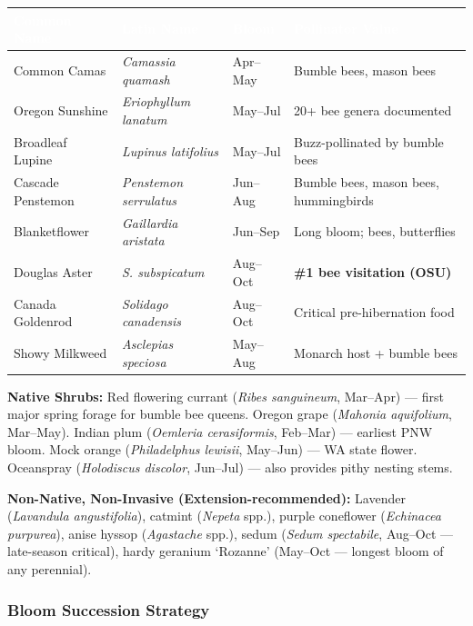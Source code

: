 \documentclass[11pt,letterpaper]{article}
\newcommand{\tableheader}[1]{\textbf{\sffamily\textcolor{white}{#1}}}
\begin{document}
\begin{center}
\begin{tabularx}{\textwidth}{L{3cm}L{3cm}C{1.5cm}X}
\toprule
{}
\tableheader{Common Name} & \tableheader{Latin Name} & \tableheader{Bloom} & \tableheader{Pollinator Value} \\
\midrule
Common Camas & \textit{Camassia quamash} & Apr--May & Bumble bees, mason bees \\
Oregon Sunshine & \textit{Eriophyllum lanatum} & May--Jul & 20+ bee genera documented \\
Broadleaf Lupine & \textit{Lupinus latifolius} & May--Jul & Buzz-pollinated by bumble bees \\
Cascade Penstemon & \textit{Penstemon serrulatus} & Jun--Aug & Bumble bees, mason bees, hummingbirds \\
Blanketflower & \textit{Gaillardia aristata} & Jun--Sep & Long bloom; bees, butterflies \\
Douglas Aster & \textit{S. subspicatum} & Aug--Oct & \textbf{\#1 bee visitation (OSU)} \\
Canada Goldenrod & \textit{Solidago canadensis} & Aug--Oct & Critical pre-hibernation food \\
Showy Milkweed & \textit{Asclepias speciosa} & May--Aug & Monarch host + bumble bees \\
\bottomrule
\end{tabularx}
\end{center}

\textbf{Native Shrubs:} Red flowering currant (\textit{Ribes sanguineum}, Mar--Apr) --- first major spring forage for bumble bee queens. Oregon grape (\textit{Mahonia aquifolium}, Mar--May). Indian plum (\textit{Oemleria cerasiformis}, Feb--Mar) --- earliest PNW bloom. Mock orange (\textit{Philadelphus lewisii}, May--Jun) --- WA state flower. Oceanspray (\textit{Holodiscus discolor}, Jun--Jul) --- also provides pithy nesting stems.

\textbf{Non-Native, Non-Invasive (Extension-recommended):} Lavender (\textit{Lavandula angustifolia}), catmint (\textit{Nepeta} spp.), purple coneflower (\textit{Echinacea purpurea}), anise hyssop (\textit{Agastache} spp.), sedum (\textit{Sedum spectabile}, Aug--Oct --- late-season critical), hardy geranium `Rozanne' (May--Oct --- longest bloom of any perennial).

\subsubsection{Bloom Succession Strategy}
\end{document}
